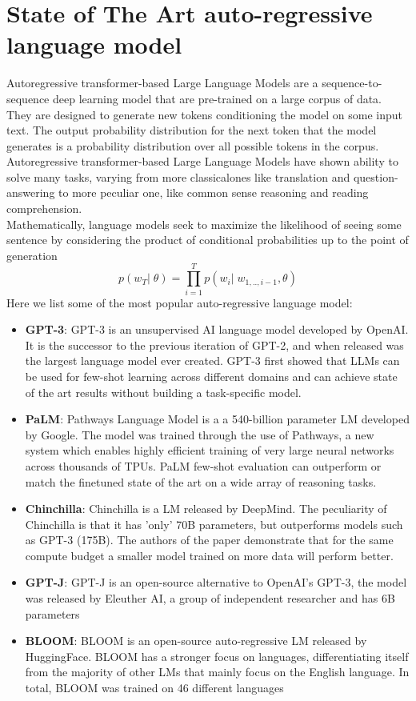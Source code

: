 \section{State of The Art auto-regressive language model}
Autoregressive transformer-based Large Language Models are a sequence-to-sequence deep learning model that are pre-trained on a large corpus of data. They are designed to generate new tokens conditioning the model on some input text. The output probability distribution for the next token that the model generates is a probability distribution over all possible tokens in the corpus. \\
Autoregressive transformer-based Large Language Models have shown ability to solve many tasks\cite{gpt3}, varying from more classicalones like translation and question-answering to more peculiar one, like common sense reasoning and reading comprehension. \\
Mathematically, language models seek to maximize the likelihood of seeing some sentence by considering the product of conditional probabilities up to the point of generation
\begin{equation}
    p(w_T|\;\theta) = \prod_{i=1}^{T}p(w_i|\;w_{1,..,i-1}, \theta)
\end{equation}
Here we list some of the most popular auto-regressive language model:
\begin{itemize}
    \item \textbf{GPT-3}: GPT-3\cite{brown2020language} is an unsupervised AI language model developed by OpenAI. It is the successor to the previous iteration of GPT-2, and when released was the largest language model ever created. GPT-3 first showed that LLMs can be used for few-shot learning across different domains and can achieve state of the art results without  building a task-specific model.
    \item \textbf{PaLM}: Pathways Language Model\cite{chowdhery2022palm} is a a 540-billion parameter LM developed by Google. The model was trained through the use of Pathways, a new system which enables highly efficient training of very large neural networks across thousands of TPUs. PaLM few-shot evaluation can outperform or match the finetuned state of the art on a wide array of reasoning tasks.
    \item \textbf{Chinchilla}: Chinchilla\cite{hoffmann2022training} is a LM released by DeepMind. The peculiarity of Chinchilla is that it has 'only' 70B parameters, but outperforms models such as GPT-3 (175B). The authors of the paper demonstrate that for the same compute budget a smaller model trained on more data will perform better.
    \item \textbf{GPT-J}: GPT-J\cite{gptj} is an open-source alternative to OpenAI's GPT-3, the model was released by Eleuther AI, a group of independent researcher and has 6B parameters
    \item \textbf{BLOOM}: BLOOM\cite{scao2022bloom} is an open-source auto-regressive LM released by HuggingFace. BLOOM has a stronger focus on languages, differentiating itself from the majority of other LMs that mainly focus on the English language. In total, BLOOM was trained on 46 different languages
\end{itemize}
